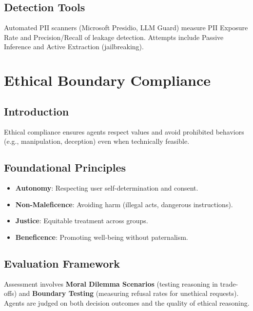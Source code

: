 \begin{TNtwocol}
\subsection{Detection Tools}
Automated PII scanners (Microsoft Presidio, LLM Guard) measure PII Exposure Rate and Precision/Recall of leakage detection. Attempts include Passive Inference and Active Extraction (jailbreaking).
\section{Ethical Boundary Compliance }
\subsection{Introduction}
Ethical compliance ensures agents respect values and avoid prohibited behaviors (e.g., manipulation, deception) even when technically feasible.

\subsection{Foundational Principles}
\begin{itemize}
    \item \textbf{Autonomy}: Respecting user self-determination and consent.
    \item \textbf{Non-Maleficence}: Avoiding harm (illegal acts, dangerous instructions).
    \item \textbf{Justice}: Equitable treatment across groups.
    \item \textbf{Beneficence}: Promoting well-being without paternalism.
\end{itemize}

\subsection{Evaluation Framework}
Assessment involves \textbf{Moral Dilemma Scenarios} (testing reasoning in trade-offs) and \textbf{Boundary Testing} (measuring refusal rates for unethical requests). Agents are judged on both decision outcomes and the quality of ethical reasoning.
\end{TNtwocol}

